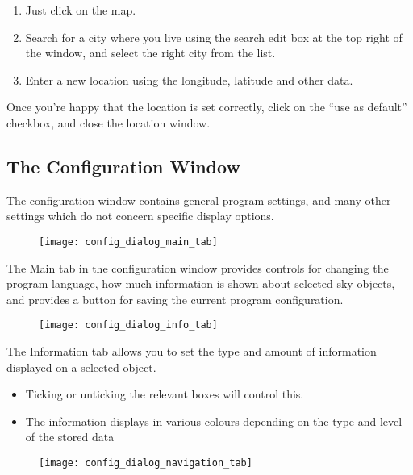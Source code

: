\begin{enumerate}
\item
  Just click on the map.
\item
  Search for a city where you live using the search edit box at the top
  right of the window, and select the right city from the list.
\item
  Enter a new location using the longitude, latitude and other data.
\end{enumerate}

Once you're happy that the location is set correctly, click on the ``use
as default'' checkbox, and close the location window.

\subsection{The Configuration Window}\label{the-configuration-window}

The configuration window contains general program settings, and many
other settings which do not concern specific display options.

\begin{figure}[h]
\centering\texttt{[image: config\_dialog\_main\_tab]}
\end{figure}

The Main tab in the configuration window provides controls for changing
the program language, how much information is shown about selected sky
objects, and provides a button for saving the current program
configuration.

\begin{figure}[h]
\centering\texttt{[image: config\_dialog\_info\_tab]}
\end{figure}

The Information tab allows you to set the type and amount of information
displayed on a selected object.
\begin{itemize}
\item Ticking or unticking the relevant boxes will control this.
\item The information displays in various colours depending on the type and
level of the stored data
\end{itemize}

\begin{figure}[h]
\centering\texttt{[image: config\_dialog\_navigation\_tab]}
\end{figure}

